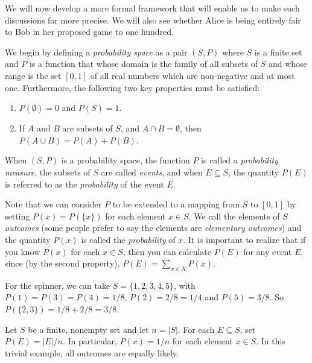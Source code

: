 We will now develop a more formal framework that will enable us to
make such discussions far more precise. We will also see whether Alice
is being entirely fair to Bob in her proposed game to one hundred.

We begin by defining a \textit{probability space} as a pair $(S,P)$ 
where $S$ is a finite set and $P$ is a function that whose domain is
the family of all subsets of $S$ and whose range is the set $[0,1]$ of
all real numbers which are non-negative and at most one.  Furthermore,
the following two key properties must be satisfied:

\begin{enumerate}
\item $P(\emptyset)=0$ and $P(S)=1$.
\item If $A$ and $B$ are subsets of $S$, and $A\cap B=\emptyset$,
then $P(A\cup B)= P(A)+P(B)$.
\end{enumerate}

When $(S,P)$ is a probability space, the function $P$ is called a 
\textit{probability measure}, the subsets of $S$ are called
\textit{events}, and when $E\subseteq S$, the quantity $P(E)$ is 
referred to as the \textit{probability} of the event $E$.  

Note that we can consider
$P$ to be extended to a mapping from $S$ to $[0,1]$ by
setting $P(x)=P(\{x\})$ for each element $x\in S$.
We call the elements of $S$ \textit{outcomes}
(some people prefer to say the elements are \textit{elementary
outcomes}) and the quantity $P(x)$ is called the \textit{probability}
of $x$.  It is important to realize that if you know $P(x)$ for
each $x\in S$, then you can calculate $P(E)$ for any event $E$,
since (by the second property), $P(E)=\sum_{x\in X}P(x)$. 

\begin{example}
For the spinner, we can take $S=\{1,2,3,4,5\}$, with $P(1)=P(3)=P(4)=1/8$,
$P(2)=2/8=1/4$ and $P(5)=3/8$.  So $P(\{2,3\})=1/8+2/8=3/8$.
\end{example}

\begin{example}
Let $S$ be a finite, nonempty set and let $n=|S|$.  
For each $E\subseteq S$, set $P(E)=|E|/n$.  In particular, $P(x)=1/n$ 
for each element $x\in S$.  In this trivial example, all outcomes 
are equally likely.
\end{example}

